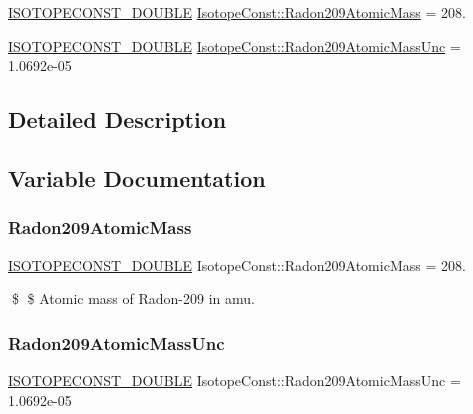 \begin{DoxyCompactItemize}
\item 
\mbox{\hyperlink{group___isotope_const-_macros_ga8f45a7272ce02c0b4c65c44636ed719a}{I\+S\+O\+T\+O\+P\+E\+C\+O\+N\+S\+T\+\_\+\+D\+O\+U\+B\+LE}} \mbox{\hyperlink{group___isotope_const-_radon-_rn209_gaf5526f9cb57a2752a13965f2c90dd5b4}{Isotope\+Const\+::\+Radon209\+Atomic\+Mass}} = 208.
\item 
\mbox{\hyperlink{group___isotope_const-_macros_ga8f45a7272ce02c0b4c65c44636ed719a}{I\+S\+O\+T\+O\+P\+E\+C\+O\+N\+S\+T\+\_\+\+D\+O\+U\+B\+LE}} \mbox{\hyperlink{group___isotope_const-_radon-_rn209_gaf3c736f995acfbef50eb91de69ba5791}{Isotope\+Const\+::\+Radon209\+Atomic\+Mass\+Unc}} = 1.\+0692e-\/05
\end{DoxyCompactItemize}


\subsection{Detailed Description}


\subsection{Variable Documentation}
\mbox{\label{group___isotope_const-_radon-_rn209_gaf5526f9cb57a2752a13965f2c90dd5b4}} 
\subsubsection{\texorpdfstring{Radon209\+Atomic\+Mass}{Radon209AtomicMass}}
{\footnotesize\ttfamily \mbox{\hyperlink{group___isotope_const-_macros_ga8f45a7272ce02c0b4c65c44636ed719a}{I\+S\+O\+T\+O\+P\+E\+C\+O\+N\+S\+T\+\_\+\+D\+O\+U\+B\+LE}} Isotope\+Const\+::\+Radon209\+Atomic\+Mass = 208.}

\$ \$ Atomic mass of Radon-\/209 in amu. \mbox{\label{group___isotope_const-_radon-_rn209_gaf3c736f995acfbef50eb91de69ba5791}} 
\subsubsection{\texorpdfstring{Radon209\+Atomic\+Mass\+Unc}{Radon209AtomicMassUnc}}
{\footnotesize\ttfamily \mbox{\hyperlink{group___isotope_const-_macros_ga8f45a7272ce02c0b4c65c44636ed719a}{I\+S\+O\+T\+O\+P\+E\+C\+O\+N\+S\+T\+\_\+\+D\+O\+U\+B\+LE}} Isotope\+Const\+::\+Radon209\+Atomic\+Mass\+Unc = 1.\+0692e-\/05}

